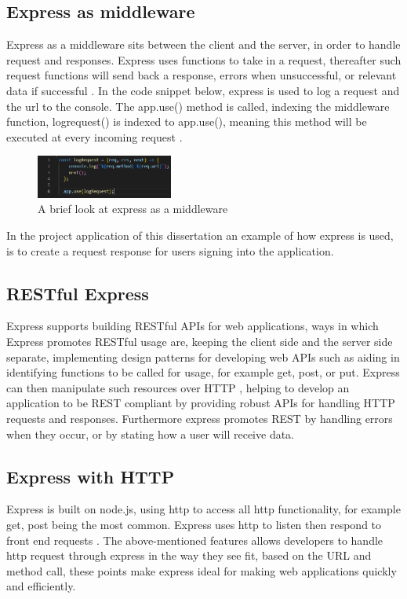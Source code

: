 \subsection{Express as middleware}
Express as a middleware sits between the client and the server, in order to handle request and responses. Express uses functions to take in a request, thereafter such request functions will send back a response, errors when unsuccessful, or relevant data if successful \cite{roomexpress}. In the code snippet below, express is used to log a request and the url to the console. The app.use() method is called, indexing the middleware function, logrequest() is indexed to app.use(), meaning this method will be executed at every incoming request \cite{ExpressMiddleware}. 
\begin{figure}[h!]
    \centering
    \includegraphics[width=0.4\textwidth]{images/express.png}
    \caption{A brief look at express as a middleware}
    \label{image:express}
\end{figure}
\newline
In the project application of this dissertation an example of how express is used, is to create a request response for users signing into the application.

\subsection{RESTful Express}
Express supports building RESTful APIs for web applications, ways in which Express promotes RESTful usage are, keeping the client side and the server side separate, implementing design patterns for developing web APIs such as aiding in identifying functions to be called for usage, for example get, post, or put. Express can then manipulate such resources over HTTP \cite{REST}, helping to develop an application to be REST compliant by providing robust APIs for handling HTTP requests and responses. Furthermore express promotes REST by handling errors when they occur, or by stating how a user will receive data.

\subsection{Express with HTTP}
Express is built on node.js, using http to access all http functionality, for example get, post being the most common. Express uses http to listen then respond to front end requests \cite{ExpressRouting}. The above-mentioned features allows developers to handle http request through express in the way they see fit, based on the URL and method call, these points make express ideal for making web applications quickly and efficiently.

